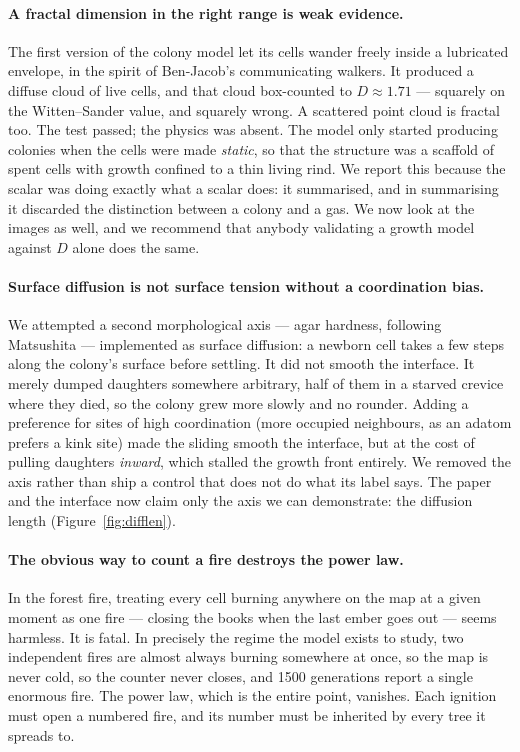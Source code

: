 \documentclass[11pt,a4paper]{article}
\begin{document}
\paragraph{A fractal dimension in the right range is weak evidence.}
The first version of the colony model let its cells wander freely inside a
lubricated envelope, in the spirit of Ben-Jacob's communicating walkers. It
produced a diffuse cloud of live cells, and that cloud box-counted to
$D\approx\num{1.71}$ --- squarely on the Witten--Sander value, and squarely
wrong. A scattered point cloud is fractal too. The test passed; the physics was
absent. The model only started producing colonies when the cells were made
\emph{static}, so that the structure was a scaffold of spent cells with growth
confined to a thin living rind. We report this because the scalar was doing
exactly what a scalar does: it summarised, and in summarising it discarded the
distinction between a colony and a gas. We now look at the images as well, and we
recommend that anybody validating a growth model against $D$ alone does the same.

\paragraph{Surface diffusion is not surface tension without a coordination bias.}
We attempted a second morphological axis --- agar hardness, following Matsushita
--- implemented as surface diffusion: a newborn cell takes a few steps along the
colony's surface before settling. It did not smooth the interface. It merely
dumped daughters somewhere arbitrary, half of them in a starved crevice where
they died, so the colony grew more slowly and no rounder. Adding a preference for
sites of high coordination (more occupied neighbours, as an adatom prefers a kink
site) made the sliding smooth the interface, but at the cost of pulling daughters
\emph{inward}, which stalled the growth front entirely. We removed the axis rather
than ship a control that does not do what its label says. The paper and the
interface now claim only the axis we can demonstrate: the diffusion length
(Figure~\ref{fig:difflen}).

\paragraph{The obvious way to count a fire destroys the power law.}
In the forest fire, treating every cell burning anywhere on the map at a given
moment as one fire --- closing the books when the last ember goes out --- seems
harmless. It is fatal. In precisely the regime the model exists to study, two
independent fires are almost always burning somewhere at once, so the map is never
cold, so the counter never closes, and 1500 generations report a single enormous
fire. The power law, which is the entire point, vanishes. Each ignition must open
a numbered fire, and its number must be inherited by every tree it spreads to.
\end{document}
